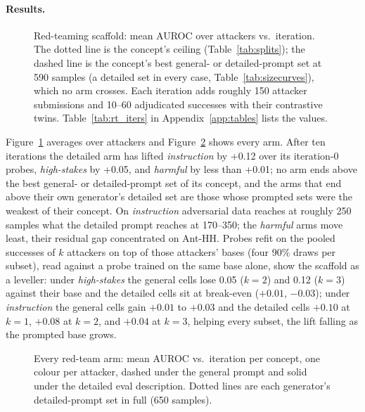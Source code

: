 \documentclass{article} %
\newcommand{\hs}{\emph{high-stakes}}
\newcommand{\harm}{\emph{harmful}}
\newcommand{\instr}{\emph{instruction}}
\begin{document}
\paragraph{Results.}
\label{sec:redteam}
\begin{figure}[H]
  \centering
  
  \caption{Red-teaming scaffold: mean AUROC over attackers vs.\ iteration. The dotted line is the concept's ceiling (Table~\ref{tab:splits}); the dashed line is the concept's best general- or detailed-prompt set at 590 samples (a detailed set in every case, Table~\ref{tab:sizecurves}), which no arm crosses. Each iteration adds roughly 150 attacker submissions and 10--60 adjudicated successes with their contrastive twins. Table~\ref{tab:rt_iters} in Appendix~\ref{app:tables} lists the values.}
  \label{fig:rt}
\end{figure}

Figure~\ref{fig:rt} averages over attackers and Figure~\ref{fig:rt_arms} shows every arm. After ten iterations the detailed arm has lifted \instr{} by +0.12 over its iteration-0 probes, \hs{} by +0.05, and \harm{} by less than +0.01; no arm ends above the best general- or detailed-prompt set of its concept, and the arms that end above their own generator's detailed set are those whose prompted sets were the weakest of their concept. On \instr{} adversarial data reaches at roughly 250 samples what the detailed prompt reaches at 170--350; the \harm{} arms move least, their residual gap concentrated on Ant-HH. Probes refit on the pooled successes of $k$ attackers on top of those attackers' bases (four 90\% draws per subset), read against a probe trained on the same base alone, show the scaffold as a leveller: under \hs{} the general cells lose 0.05 ($k{=}2$) and 0.12 ($k{=}3$) against their base and the detailed cells sit at break-even ($+0.01$, $-0.03$); under \instr{} the general cells gain $+0.01$ to $+0.03$ and the detailed cells $+0.10$ at $k{=}1$, $+0.08$ at $k{=}2$, and $+0.04$ at $k{=}3$, helping every subset, the lift falling as the prompted base grows.

\begin{figure}[H]
  \centering
  
  \caption{Every red-team arm: mean AUROC vs.\ iteration per concept, one colour per attacker, dashed under the general prompt and solid under the detailed eval description. Dotted lines are each generator's detailed-prompt set in full (650 samples).}
  \label{fig:rt_arms}
\end{figure}
\end{document}
